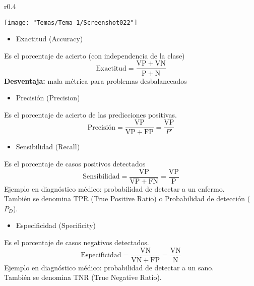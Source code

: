 \begin{wrapfigure}{r}{0.4\textwidth}
	\begin{center}
		\texttt{[image: "Temas/Tema 1/Screenshot022"]}
	\end{center}
\end{wrapfigure}

\begin{itemize}[label=\color{red}\textbullet, leftmargin=*]
	\item \color{lightblue}Exactitud (Accuracy)
\end{itemize}
Es el porcentaje de acierto (con independencia de la clase) \[ \mathrm{Exactitud}=\dfrac{\mathrm{VP}+\mathrm{VN}}{\mathrm{P}+\mathrm{N}} \]
\textbf{Desventaja:} mala métrica para problemas desbalanceados
\begin{itemize}[label=\color{red}\textbullet, leftmargin=*]
	\item \color{lightblue}Precisión (Precision)
\end{itemize}
Es el porcentaje de acierto de las predicciones positivas. \[ \text{Precisión}=\dfrac{\mathrm{VP}}{\mathrm{VP}+\mathrm{FP}}=\dfrac{\mathrm{VP}}{P'} \]
\begin{itemize}[label=\color{red}\textbullet, leftmargin=*]
	\item \color{lightblue}Sensibilidad (Recall)
\end{itemize}
Es el porcentaje de casos positivos detectados \[ \mathrm{Sensibilidad}=\dfrac{\mathrm{VP}}{\mathrm{VP}+\mathrm{FN}}=\dfrac{\mathrm{VP}}{\mathrm{P}} \]
Ejemplo en diagnóstico médico: probabilidad de detectar a un enfermo.\\
También se denomina TPR (True Positive Ratio) o Probabilidad de detección ($P_D$).
\begin{itemize}[label=\color{red}\textbullet, leftmargin=*]
	\item \color{lightblue}Especificidad (Specificity)
\end{itemize}
Es el porcentaje de casos negativos detectados. \[ \mathrm{Especificidad}=\dfrac{\mathrm{VN}}{\mathrm{VN}+\mathrm{FP}}=\dfrac{\mathrm{VN}}{\mathrm{N}} \]
Ejemplo en diagnóstico médico: probabilidad de detectar a un sano.\\
También se denomina TNR (True Negative Ratio).
